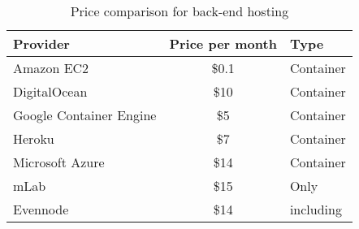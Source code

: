 \begin{table}
\caption{Price comparison for back-end hosting}
\label{tbl:hosting}

\begin{tabularx}{\textwidth}{LcL}
\textbf{Provider} & \textbf{Price per month} & \textbf{Type} \\
\hline 
Amazon EC2                  & \$0.1 & Container \\
DigitalOcean                & \$10  & Container \\
Google Container Engine     & \$5   & Container \\
Heroku                      & \$7   & Container \\
Microsoft Azure             & \$14  & Container \\
mLab                        & \$15  & Only  \\
Evennode                    & \$14  &  including  \\
\hline
\end{tabularx} 
\end{table}
